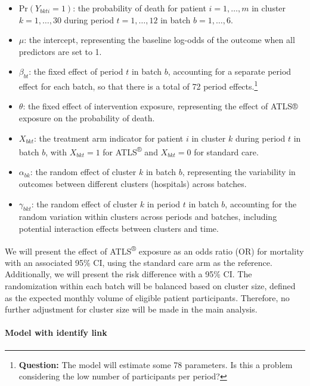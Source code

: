 \documentclass[
]{scrartcl}
\let\oldparagraph\paragraph
\renewcommand{\paragraph}[1]{\oldparagraph{#1}\mbox{}}
\providecommand{\tightlist}{%
  \setlength{\itemsep}{0pt}\setlength{\parskip}{0pt}}\usepackage{longtable,booktabs,array}
\begin{document}
\begin{itemize}
\tightlist
\item
  \(\text{Pr}(Y_{bkti} = 1)\): the probability of death for patient
  \(i = 1, \dotsc,m\) in cluster \(k = 1, \dotsc, 30\) during period
  \(t = 1, \dotsc, 12\) in batch \(b = 1, \dotsc, 6\).
\item
  \(\mu\): the intercept, representing the baseline log-odds of the
  outcome when all predictors are set to 1.
\item
  \(\beta_{bt}\): the fixed effect of period \(t\) in batch \(b\),
  accounting for a separate period effect for each batch, so that there
  is a total of 72 period effects.\footnote{\textbf{Question:} The model
    will estimate some 78 parameters. Is this a problem considering the
    low number of participants per period?}
\item
  \(\theta\): the fixed effect of intervention exposure, representing
  the effect of ATLS® exposure on the probability of death.
\item
  \(X_{bkt}\): the treatment arm indicator for patient \(i\) in cluster
  \(k\) during period \(t\) in batch \(b\), with \(X_{bkt} = 1\) for
  ATLS\textsuperscript{®} and \(X_{bkt} = 0\) for standard care.
\item
  \(\alpha_{bk}\): the random effect of cluster \(k\) in batch \(b\),
  representing the variability in outcomes between different clusters
  (hospitals) across batches.
\item
  \(\gamma_{bkt}\): the random effect of cluster \(k\) in period \(t\)
  in batch \(b\), accounting for the random variation within clusters
  across periods and batches, including potential interaction effects
  between clusters and time.
\end{itemize}

We will present the effect of ATLS\textsuperscript{®} exposure as an
odds ratio (OR) for mortality with an associated 95\% CI, using the
standard care arm as the reference. Additionally, we will present the
risk difference with a 95\% CI. The randomization within each batch will
be balanced based on cluster size, defined as the expected monthly
volume of eligible patient participants. Therefore, no further
adjustment for cluster size will be made in the main analysis.

\hypertarget{model-with-identify-link}{%
\paragraph{Model with identify link}\label{model-with-identify-link}}
\end{document}

